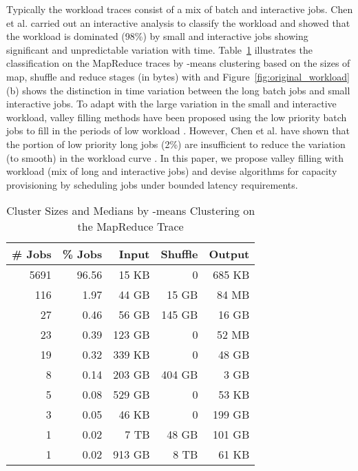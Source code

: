 \documentclass[10pt,conference,compsocconf,letterpaper]{IEEEtran}
\begin{document}
Typically the workload traces consist of a mix of batch and interactive jobs. Chen et al. carried out an interactive analysis to classify the workload and showed that the workload is dominated (98\%) by small and interactive jobs showing significant and unpredictable variation with time. Table~\ref{table:trace} illustrates the classification on the MapReduce traces by -means clustering based on the sizes of map, shuffle and reduce stages (in bytes) with  and Figure~\ref{fig:original_workload}(b) shows the distinction in time variation between the long batch jobs and small interactive jobs. To adapt with the large variation in the small and interactive workload, valley filling methods have been proposed using the low priority batch jobs to fill in the periods of low workload \cite{Liu}. However, Chen et al. have shown that the portion of low priority long jobs (2\%) are insufficient to reduce the variation (to smooth) in the workload curve \cite{n5}. In this paper, we propose valley filling with workload (mix of long and interactive jobs) and devise algorithms for capacity provisioning by scheduling jobs under bounded latency requirements.



\begin{table}[!t]
\caption{Cluster Sizes and Medians by -means Clustering on the MapReduce Trace} \centering  \begin{tabular}{r r r r r} \hline\hline                        \# Jobs & \% Jobs & Input & Shuffle & Output \\ [0.5ex] \hline                  5691 & 96.56 & 15 KB & 0 & 685 KB \\ 116 & 1.97 & 44 GB & 15 GB  & 84 MB  \\
27 & 0.46 & 56 GB & 145 GB & 16 GB \\
23 & 0.39 & 123 GB & 0 & 52 MB \\
19 & 0.32 & 339 KB & 0 & 48 GB\\ [1ex]      8 & 0.14 & 203 GB & 404 GB & 3 GB \\
5 & 0.08 & 529 GB & 0 & 53 KB \\
3 & 0.05 & 46 KB & 0 & 199 GB\\
1 & 0.02 & 7 TB & 48 GB & 101 GB \\
1 & 0.02 & 913 GB& 8 TB & 61 KB \\
\hline \end{tabular}
\label{table:trace} \end{table}
\end{document}
